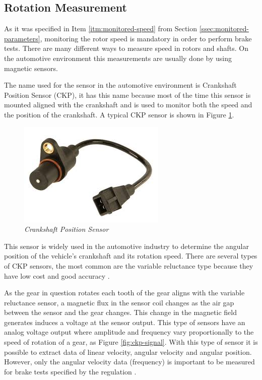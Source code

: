 \subsection{Rotation Measurement}\label{ssec:speedMeasurement}
	
	As it was specified in Item \ref{itm:monitored-speed} from Section \ref{ssec:monitored-parameters}, monitoring the rotor speed is mandatory in order to perform brake tests. There are many different ways to measure speed in rotors and shafts. On the automotive environment this measurements are usually done by using magnetic sensors.
	\par
	The name used for the sensor in the automotive environment is Crankshaft Position Sensor (CKP), it has this name because most of the time this sensor is mounted aligned with the crankshaft and is used to monitor both the speed and the position of the crankshaft. A typical CKP sensor is shown in Figure \ref{fig-ckpReal}.

	\begin{figure}[htbp]
		\centering
		\includegraphics[width=.5\textwidth]{figuras/fig-ckp-real.jpg}
		\caption{\textit{Crankshaft Position Sensor} \cite{ckp-gm}}
		\label{fig-ckpReal}
	\end{figure}

	This sensor is widely used in the automotive industry to determine the angular position of the vehicle's crankshaft and its rotation speed. There are several types of CKP sensors, the most common are the variable reluctance type because they have low cost and good accuracy \cite{schroeder2002crankshaft}.
	\par
	As the gear in question rotates each tooth of the gear aligns with the variable reluctance sensor, a magnetic flux in the sensor coil changes as the air gap between the sensor and the gear changes. This change in the magnetic field generates induces a voltage at the sensor output. This type of sensors have an analog voltage output where amplitude and frequency vary proportionally to the speed of rotation of a gear, as Figure \ref{fig:ckp-signal}. With this type of sensor it is possible to extract data of linear velocity, angular velocity and angular position. However, only the angular velocity data (frequency) is important to be measured for brake tests specified by the regulation \cite{saej2522}. 

